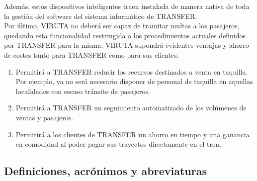 Además, estos dispositivos inteligentes traen instalada de manera nativa de toda la gestión del software del sistema informático de TRANSFER.\\


Por último, VIRUTA no deberá ser capaz de tramitar multas a los pasajeros, quedando esta funcionalidad restringida a los procedimientos actuales definidos por TRANSFER para la misma.
VIRUTA supondrá evidentes ventajas y ahorro de costes tanto para TRANSFER como para sus clientes.\\

\begin{enumerate}
\item Permitirá a TRANSFER reducir los recursos destinados a venta en taquilla. Por ejemplo, ya no será necesario disponer de personal de taquilla en aquellas localidades con escaso tránsito de pasajeros.
\item Permitirá a TRANSFER un seguimiento automatizado de los volúmenes de ventas y pasajeros.
\item Permitirá a los clientes de TRANSFER un ahorro en tiempo y una ganancia en comodidad al poder pagar sus trayectos directamente en el tren.
\end{enumerate}

\subsection{Definiciones, acrónimos y abreviaturas}

